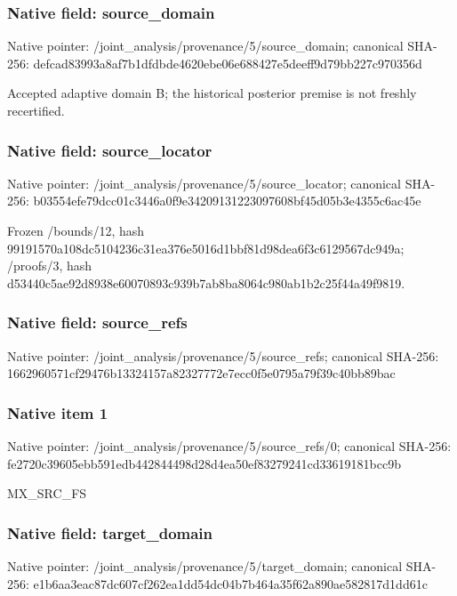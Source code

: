 \documentclass[10pt,a4paper]{article}
\begin{document}
\subsubsection{Native field: source\_\allowbreak{}domain}
Native pointer: /joint\_\allowbreak{}analysis/provenance/5/source\_\allowbreak{}domain; canonical SHA-256: defcad83993a8af7b1dfdbde4620ebe06e688427e5deeff9d79bb227c970356d

\begingroup\raggedright\sloppy Accepted adaptive domain B;\allowbreak{} the historical posterior premise is not freshly recertified.\par\endgroup

\subsubsection{Native field: source\_\allowbreak{}locator}
Native pointer: /joint\_\allowbreak{}analysis/provenance/5/source\_\allowbreak{}locator; canonical SHA-256: b03554efe79dcc01c3446a0f9e34209131223097608bf45d05b3e4355c6ac45e

\begingroup\raggedright\sloppy Frozen /\allowbreak{}bounds/\allowbreak{}12,\allowbreak{} hash 99191570a108dc5104236c31ea376e5016d1bbf81d98dea6f3c6129567dc949a;\allowbreak{} /\allowbreak{}proofs/\allowbreak{}3,\allowbreak{} hash d53440c5ae92d8938e60070893c939b7ab8ba8064c980ab1b2c25f44a49f9819.\par\endgroup

\subsubsection{Native field: source\_\allowbreak{}refs}
Native pointer: /joint\_\allowbreak{}analysis/provenance/5/source\_\allowbreak{}refs; canonical SHA-256: 1662960571cf29476b13324157a82327772e7ecc0f5e0795a79f39c40bb89bac

\subsubsection{Native item 1}
Native pointer: /joint\_\allowbreak{}analysis/provenance/5/source\_\allowbreak{}refs/0; canonical SHA-256: fe2720c39605ebb591edb442844498d28d4ea50ef83279241cd33619181bcc9b

\begingroup\raggedright\sloppy MX\_\allowbreak{}SRC\_\allowbreak{}FS\par\endgroup

\subsubsection{Native field: target\_\allowbreak{}domain}
Native pointer: /joint\_\allowbreak{}analysis/provenance/5/target\_\allowbreak{}domain; canonical SHA-256: e1b6aa3eac87dc607cf262ea1dd54dc04b7b464a35f62a890ae582817d1dd61c
\end{document}

